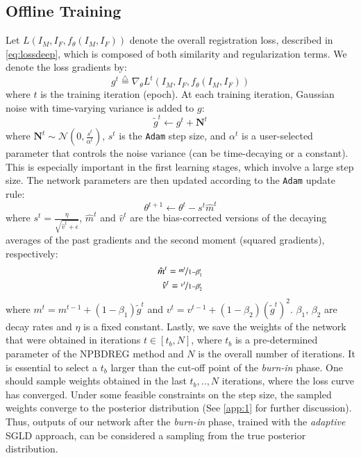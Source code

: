 \documentclass[preprint,authoryear]{elsarticle}
\begin{document}
\subsection{Offline Training}\label{subsec:offlinetraining}
Let $L(I_M,I_F,f_\theta(I_M,I_F))$ denote the overall registration loss, described in \eqref{eq:lossdeep}, which is composed of both similarity and regularization terms. We denote the loss gradients by:
\begin{equation}
g^t\overset{\triangle}{=}\nabla_{\theta}L^t(I_{M},I_{F},f_{\theta}(I_{M},I_{F}))
\end{equation}
where $t$ is the training iteration (epoch). At each training iteration, Gaussian noise with time-varying variance is added to $g$:
\begin{equation}
\tilde{g}^{t}\leftarrow g^{t}+\textbf{N}^{t} 
\end{equation}
where $\textbf{N}^{t}\sim\mathcal{N}(0,\frac{s^{t}}{\alpha^{t}})$, $s^{t}$ is the \texttt{Adam} step size, and $\alpha^{t}$ is a user-selected parameter that controls the noise variance (can be time-decaying or a constant). This is especially important in the first learning stages, which involve a large step size. 
The network parameters are then updated according to the \texttt{Adam} update rule:
\begin{equation} 
\theta^{t+1}\leftarrow \theta^{t} - s^{t}\hat{m}^{t}
\end{equation}
where $s^{t}=\frac{\eta}{\sqrt{\hat{v}^{t}+\epsilon}}$, $\hat{m}^{t}$ and $\hat{v}^{t}$ are the bias-corrected versions of the decaying averages of the past gradients and the second moment (squared gradients), respectively:
\begin{align}
\hat{m}^{t} = \nicefrac{m^{t}}{1-\beta_{1}^{t}} \nonumber \\
\hat{v}^{t} = \nicefrac{v^{t}}{1-\beta_{2}^{t}}
\end{align}
where $m^{t}=m^{t-1}+(1-\beta_{1})\tilde{g}^{t}$ and $v^{t}=v^{t-1}+(1-\beta_{2})(\tilde{g}^{t})^2$. $\beta_{1}$, $\beta_{2}$ are decay rates and $\eta$ is a fixed constant. 
Lastly, we save the weights of the network that were obtained in iterations $t\in \left[t_b,N\right]$, where $t_b$ is a pre-determined  parameter of the NPBDREG method and $N$ is the overall number of iterations. It is essential to select a $t_b$ larger than the cut-off point of the \textit{burn-in} phase. One should sample weights obtained in the last $t_b,..,N$ iterations, where the loss curve has converged. Under some feasible constraints on the step size, the sampled weights converge to the posterior distribution \cite{welling2011bayesian} (See \ref{app:1} for further discussion). 
Thus, outputs of our network after the \textit{burn-in} phase, trained with the {\it adaptive} SGLD approach, can be considered a sampling from the true posterior distribution.
\end{document}
